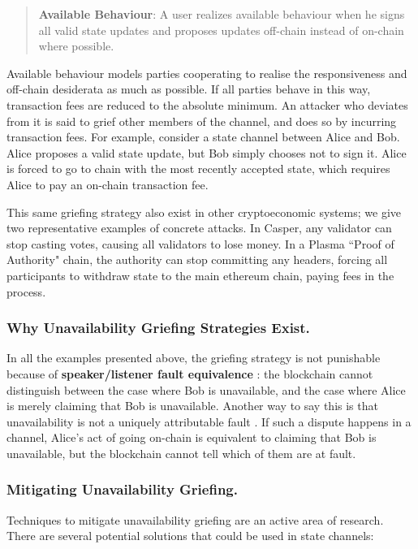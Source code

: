 \documentclass[prb,floatfix,reprint,nofootinbib,amsmath,amssymb,epsfig,pre,floats,letterpaper,groupedaffiliation,tightenlines,allcolors=blue,11pt]{revtex4}
\theoremstyle{definition}
\theoremstyle{definition}
\theoremstyle{definition}
\begin{document}
\begin{quote}
\textbf{Available Behaviour}: A user realizes available behaviour when he signs all valid state updates and proposes updates off-chain instead of on-chain where possible.
\end{quote}

Available behaviour models parties cooperating to realise the responsiveness and off-chain desiderata as much as possible. If all parties behave in this way, transaction fees are reduced to the absolute minimum. An attacker who deviates from it is said to grief other members of the channel, and does so by incurring transaction fees. For example, consider a state channel between Alice and Bob. Alice proposes a valid state update, but Bob simply chooses not to sign it. Alice is forced to go to chain with the most recently accepted state, which requires Alice to pay an on-chain transaction fee.

This same griefing strategy also exist in other cryptoeconomic systems; we give two representative examples of concrete attacks. In Casper, any validator can stop casting votes, causing all validators to lose money. In a Plasma ``Proof of Authority" chain, the authority can stop committing any headers, forcing all participants to withdraw state to the main ethereum chain, paying fees in the process.

\subsubsection{Why Unavailability Griefing Strategies Exist.} In all the examples presented above, the griefing strategy is not punishable because of \textbf{speaker/listener fault equivalence} \cite{vitalik:triangle}: the blockchain cannot distinguish between the case where Bob is unavailable, and the case where Alice is merely claiming that Bob is unavailable. Another way to say this is that unavailability is not a uniquely attributable fault \cite{ethwiki:data}. If such a dispute happens in a channel, Alice's act of going on-chain is equivalent to claiming that Bob is unavailable, but the blockchain cannot tell which of them are at fault.

\subsubsection{Mitigating Unavailability Griefing.} Techniques to mitigate unavailability griefing are an active area of research. There are several potential solutions that could be used in state channels:
\end{document}
